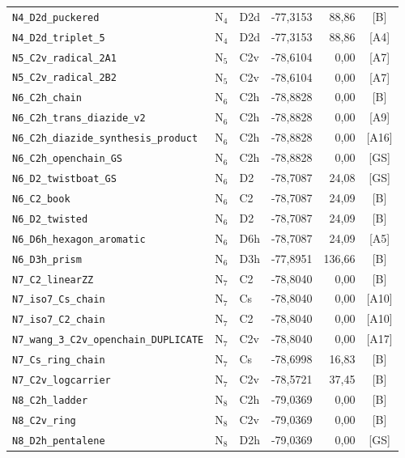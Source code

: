 \begin{longtable}{@{}p{4.4cm}lp{1.5cm}rrc@{}}
\texttt{N4\_D2d\_puckered} & N$_{4}$ & D2d & -77{,}3153 & 88{,}86 & [B] \\
\texttt{N4\_D2d\_triplet\_5} & N$_{4}$ & D2d & -77{,}3153 & 88{,}86 & [A4] \\
\addlinespace
\texttt{N5\_C2v\_radical\_2A1} & N$_{5}$ & C2v & -78{,}6104 & 0{,}00 & [A7] \\
\texttt{N5\_C2v\_radical\_2B2} & N$_{5}$ & C2v & -78{,}6104 & 0{,}00 & [A7] \\
\addlinespace
\texttt{N6\_C2h\_chain} & N$_{6}$ & C2h & -78{,}8828 & 0{,}00 & [B] \\
\texttt{N6\_C2h\_trans\_diazide\_v2} & N$_{6}$ & C2h & -78{,}8828 & 0{,}00 & [A9] \\
\texttt{N6\_C2h\_diazide\_synthesis\_product} & N$_{6}$ & C2h & -78{,}8828 & 0{,}00 & [A16] \\
\texttt{N6\_C2h\_openchain\_GS} & N$_{6}$ & C2h & -78{,}8828 & 0{,}00 & [GS] \\
\texttt{N6\_D2\_twistboat\_GS} & N$_{6}$ & D2 & -78{,}7087 & 24{,}08 & [GS] \\
\texttt{N6\_C2\_book} & N$_{6}$ & C2 & -78{,}7087 & 24{,}09 & [B] \\
\texttt{N6\_D2\_twisted} & N$_{6}$ & D2 & -78{,}7087 & 24{,}09 & [B] \\
\texttt{N6\_D6h\_hexagon\_aromatic} & N$_{6}$ & D6h & -78{,}7087 & 24{,}09 & [A5] \\
\texttt{N6\_D3h\_prism} & N$_{6}$ & D3h & -77{,}8951 & 136{,}66 & [B] \\
\addlinespace
\texttt{N7\_C2\_linearZZ} & N$_{7}$ & C2 & -78{,}8040 & 0{,}00 & [B] \\
\texttt{N7\_iso7\_Cs\_chain} & N$_{7}$ & Cs & -78{,}8040 & 0{,}00 & [A10] \\
\texttt{N7\_iso7\_C2\_chain} & N$_{7}$ & C2 & -78{,}8040 & 0{,}00 & [A10] \\
\texttt{N7\_wang\_3\_C2v\_openchain\_DUPLICATE} & N$_{7}$ & C2v & -78{,}8040 & 0{,}00 & [A17] \\
\texttt{N7\_Cs\_ring\_chain} & N$_{7}$ & Cs & -78{,}6998 & 16{,}83 & [B] \\
\texttt{N7\_C2v\_logcarrier} & N$_{7}$ & C2v & -78{,}5721 & 37{,}45 & [B] \\
\addlinespace
\texttt{N8\_C2h\_ladder} & N$_{8}$ & C2h & -79{,}0369 & 0{,}00 & [B] \\
\texttt{N8\_C2v\_ring} & N$_{8}$ & C2v & -79{,}0369 & 0{,}00 & [B] \\
\texttt{N8\_D2h\_pentalene} & N$_{8}$ & D2h & -79{,}0369 & 0{,}00 & [GS] \\

\end{longtable}
